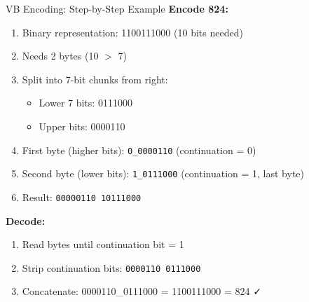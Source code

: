\documentclass[aspectratio=169]{beamer}
\begin{document}
\begin{frame}[shrink=5]{VB Encoding: Step-by-Step Example}
\textbf{Encode 824:}

\vspace{0.5em}

\begin{enumerate}
    \item Binary representation: 1100111000 (10 bits needed)
    \item Needs 2 bytes (10 $>$ 7)
    \item Split into 7-bit chunks from right: \\
    \begin{itemize}
        \item Lower 7 bits: 0111000
        \item Upper bits: 0000110
    \end{itemize}
    \item First byte (higher bits): \texttt{0\_0000110} (continuation = 0)
    \item Second byte (lower bits): \texttt{1\_0111000} (continuation = 1, last byte)
    \item Result: \texttt{00000110 10111000}
\end{enumerate}

\vspace{1em}

\textbf{Decode:}
\begin{enumerate}
    \item Read bytes until continuation bit = 1
    \item Strip continuation bits: \texttt{0000110 0111000}
    \item Concatenate: 0000110\_0111000 = 1100111000 = 824 \faCheck 
\end{enumerate}
\end{frame}
\end{document}
